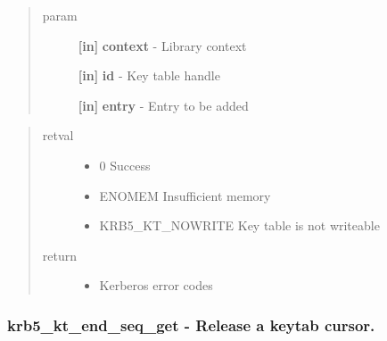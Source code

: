 \documentclass[letterpaper,10pt,english]{sphinxmanual}
\begin{document}
\begin{fulllineitems}
\label{appdev/refs/api/krb5_kt_add_entry:krb5_kt_add_entry}
\end{fulllineitems}

\begin{quote}\begin{description}
\item[{param}] \leavevmode
\textbf{{[}in{]}} \textbf{context} - Library context

\textbf{{[}in{]}} \textbf{id} - Key table handle

\textbf{{[}in{]}} \textbf{entry} - Entry to be added

\end{description}\end{quote}
\begin{quote}\begin{description}
\item[{retval}] \leavevmode\begin{itemize}
\item {} 
0   Success

\item {} 
ENOMEM   Insufficient memory

\item {} 
KRB5\_KT\_NOWRITE   Key table is not writeable

\end{itemize}

\item[{return}] \leavevmode\begin{itemize}
\item {} 
Kerberos error codes

\end{itemize}

\end{description}\end{quote}


\subsubsection{krb5\_kt\_end\_seq\_get -  Release a keytab cursor.}
\label{appdev/refs/api/krb5_kt_end_seq_get::doc}\label{appdev/refs/api/krb5_kt_end_seq_get:krb5-kt-end-seq-get-release-a-keytab-cursor}
\end{document}
